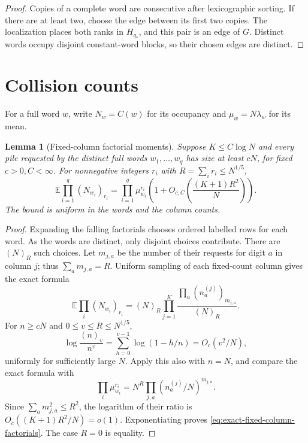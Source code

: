 \documentclass[11pt]{article}
\numberwithin{equation}{section}
\newtheorem{lemma}[lemma]{Lemma}
\newcommand{\E}{\mathbb E}
\newcommand{\1}{\mathbf 1}
\begin{document}
\begin{proof}
Copies of a complete word are consecutive after lexicographic sorting.
If there are at least two, choose the edge between its first two copies.
The localization places both ranks in \(H_{q_*}\), and this pair
is an edge of \(G\).  Distinct words occupy disjoint constant-word
blocks, so their chosen edges are distinct.
\end{proof}
\section{Collision counts}

For a full word $w$, write $N_w=C(w)$ for its occupancy and
$\mu_w=N\lambda_w$ for its mean.

\begin{lemma}[Fixed-column factorial moments]
\label{lem:fixed-column-factorial}
Suppose $K\le C\log N$ and every pile requested by the distinct full words
$w_1,\ldots,w_q$ has size at least $cN$, for fixed $c>0,C<\infty$.
For nonnegative integers $r_i$ with $R=\sum_i r_i\le N^{1/5}$,
\begin{equation}
\label{eq:exact-fixed-column-factorials}
 \E\prod_{i=1}^q(N_{w_i})_{r_i}
 =\prod_{i=1}^q\mu_{w_i}^{r_i}
    \left(1+O_{c,C}\left(\frac{(K+1)R^2}{N}\right)\right).
\end{equation}
The bound is uniform in the words and the column counts.
\end{lemma}

\begin{proof}
Expanding the falling factorials chooses ordered labelled rows for each
word. As the words are distinct, only disjoint choices contribute. There
are $(N)_R$ such choices. Let $m_{j,a}$ be the number of their requests for
digit $a$ in column $j$; thus $\sum_a m_{j,a}=R$.
Uniform sampling of each fixed-count column gives the exact formula
\[
 \E\prod_i(N_{w_i})_{r_i}
 =(N)_R\prod_{j=1}^K
                \frac{\prod_a(n_a^{(j)})_{m_{j,a}}}{(N)_R}.
\]
For $n\ge cN$ and $0\le v\le R\le N^{1/5}$,
\[
 \log\frac{(n)_v}{n^v}
 =\sum_{h=0}^{v-1}\log(1-h/n)=O_c(v^2/N),
\]
uniformly for sufficiently large $N$. Apply this also with $n=N$,
and compare the exact formula with
\[
 \prod_i\mu_{w_i}^{r_i}
   =N^R\prod_{j,a}(n_a^{(j)}/N)^{m_{j,a}}.
\]
Since $\sum_a m_{j,a}^2\le R^2$, the logarithm of their ratio is
$O_c((K+1)R^2/N)=o(1)$. Exponentiating proves
\eqref{eq:exact-fixed-column-factorials}. The case $R=0$ is equality.
\end{proof}
\end{document}
